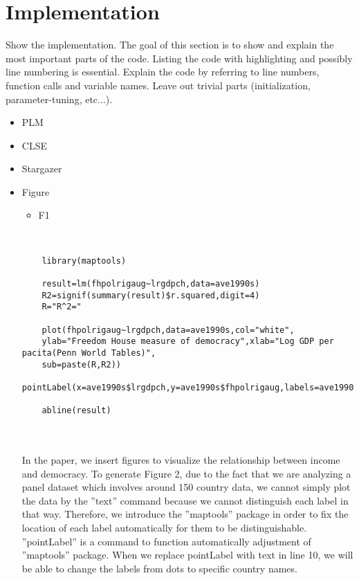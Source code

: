 \section{Implementation}\label{Sec:Implementation}

Show the implementation. The goal of this section is to show and explain the most important parts of the code. Listing the code with highlighting and possibly line numbering is essential.
Explain the code by referring to line numbers, function calls and variable names.
Leave out trivial parts (initialization, parameter-tuning, etc...).
\begin{itemize}
	\item PLM
	\item CLSE
	\item Stargazer
	\item Figure
	
	\begin{itemize}
		\item F1
	\end{itemize}
	\\
	\begin{lstlisting}
	library(maptools)
	
	result=lm(fhpolrigaug~lrgdpch,data=ave1990s)
	R2=signif(summary(result)$r.squared,digit=4)
	R="R^2="
	
	plot(fhpolrigaug~lrgdpch,data=ave1990s,col="white",
	ylab="Freedom House measure of democracy",xlab="Log GDP per pacita(Penn World Tables)",
	sub=paste(R,R2))
	pointLabel(x=ave1990s$lrgdpch,y=ave1990s$fhpolrigaug,labels=ave1990s$code,col="black")
	
	abline(result)
	\end{lstlisting}
	\\
	\\
	
	In the paper, we insert figures to visualize the relationship between income and democracy. To
	generate Figure 2, due to the fact that we are analyzing a panel dataset which involves around
	150 country data, we cannot simply plot the data by the ”text” command because we cannot
	distinguish each label in that way. Therefore, we introduce the ”maptools” package in order
	to fix the location of each label automatically for them to be distinguishable. ”pointLabel” is
	a command to function automatically adjustment of ”maptools” package. When we replace
	pointLabel with text in line 10, we will be able to change the labels from dots to specific
	country names.
	\\
	\\
	

\end{itemize}
